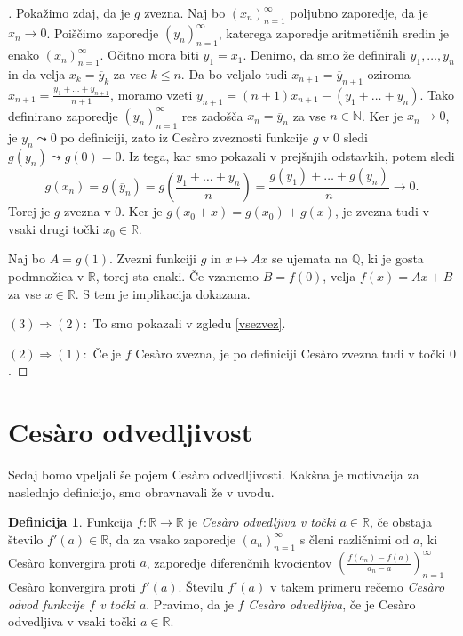 \documentclass[a4paper,12pt]{article}
\theoremstyle{definition}
\newtheorem{definicija}{Definicija}
\theoremstyle{plain}
\newenvironment{dokaz}{\begin{proof}[\bfseries\upshape\proofname]}{\end{proof}}
\begin{document}
\begin{dokaz}
    Pokažimo zdaj, da je $g$ zvezna. Naj bo $(x_n)_{n=1}^{\infty}$ poljubno zaporedje, da je $x_n \rightarrow 0$. Poiščimo zaporedje $(y_n)_{n=1}^{\infty}$, katerega zaporedje aritmetičnih sredin je enako $(x_n)_{n=1}^{\infty}$. Očitno mora biti $y_1 = x_1$. Denimo, da smo že definirali $y_1, \ldots, y_n$ in da velja $x_k = \overline{y}_k$ za vse $k \leq n$. Da bo veljalo tudi $x_{n+1} = \overline{y}_{n+1}$ oziroma $x_{n+1} = \frac{y_1 + \ldots + y_{n+1}}{n+1}$, moramo vzeti $y_{n+1} = (n+1)x_{n+1} - (y_1 + \ldots + y_n)$. Tako definirano zaporedje $(y_n)_{n=1}^{\infty}$ res zadošča $x_n = \overline{y}_n$ za vse $n \in \mathbb{N}$. Ker je $x_n \rightarrow 0$, je $y_n \leadsto 0$ po definiciji, zato iz Ces\`{a}ro zveznosti funkcije $g$ v $0$ sledi $g(y_n) \leadsto g(0) = 0$. Iz tega, kar smo pokazali v prejšnjih odstavkih, potem sledi 
    $$g(x_n) = g(\overline{y}_n) = g\left( \frac{y_1 + \ldots + y_n}{n} \right) = \frac{g(y_1) + \ldots + g(y_n)}{n} \rightarrow 0.$$
    Torej je $g$ zvezna v $0$. Ker je $g(x_0 + x) = g(x_0) + g(x)$, je zvezna tudi v vsaki drugi točki $x_0 \in \mathbb{R}$.

    Naj bo $A = g(1)$. Zvezni funkciji $g$ in $x \mapsto Ax$ se ujemata na $\mathbb{Q}$, ki je gosta podmnožica v $\mathbb{R}$, torej sta enaki. Če vzamemo $B = f(0)$, velja $f(x) = Ax + B$ za vse $x \in \mathbb{R}$. S tem je implikacija dokazana.

    $(3) \Rightarrow (2): $ To smo pokazali v zgledu \ref{vsezvez}.

    $(2) \Rightarrow (1): $ Če je $f$ Ces\`{a}ro zvezna, je po definiciji Ces\`{a}ro zvezna tudi v točki $0$.
\end{dokaz}



\section{Ces\`{a}ro odvedljivost}

Sedaj bomo vpeljali še pojem Ces\`{a}ro odvedljivosti. Kakšna je motivacija za naslednjo definicijo, smo obravnavali že v uvodu.

\begin{definicija}
    Funkcija $f: \mathbb{R} \rightarrow \mathbb{R}$ je \emph{Ces\`{a}ro odvedljiva v točki $a \in \mathbb{R}$}, če obstaja število $f'(a) \in \mathbb{R}$, da za vsako zaporedje $(a_n)_{n=1}^{\infty}$ s členi različnimi od $a$, ki Ces\`{a}ro konvergira proti $a$, zaporedje diferenčnih kvocientov $\left( \frac{f(a_n)-f(a)}{a_n-a} \right)_{n=1}^{\infty}$ Ces\`{a}ro konvergira proti $f'(a)$. Številu $f'(a)$ v takem primeru rečemo \emph{Ces\`{a}ro odvod funkcije $f$ v točki $a$}. Pravimo, da je $f$ \emph{Ces\`{a}ro odvedljiva}, če je Ces\`{a}ro odvedljiva v vsaki točki $a \in \mathbb{R}$.
\end{definicija}
\end{document}
